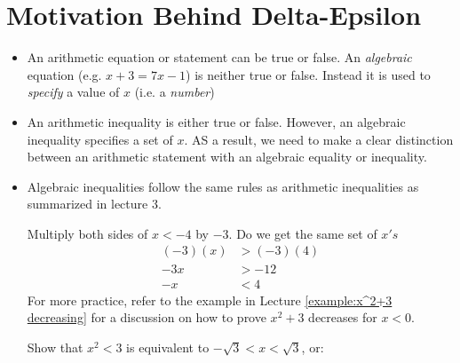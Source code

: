\section{Motivation Behind Delta-Epsilon}
\begin{itemize}
    \item An arithmetic equation or statement can be true or false. An \textit{algebraic} equation (e.g. $x+3=7x-1$) is neither true or false. Instead it is used to \textit{specify} a value of $x$ (i.e. a \textit{number})
    \item An arithmetic inequality is either true or false. However, an algebraic inequality specifies a set of $x$. AS a result, we need to make a clear distinction between an arithmetic statement with an algebraic equality or inequality.
    \item Algebraic inequalities follow the same rules as arithmetic inequalities as summarized in lecture 3.
    \begin{example}
        Multiply both sides of $x<-4$ by $-3$. Do we get the same set of $x's$
        \begin{align}
        (-3)(x) &> (-3)(4) \\ 
        -3x &> -12 \\
        -x &< 4
        \end{align}
        For more practice, refer to the example in Lecture \ref{example:x^2+3 decreasing} for a discussion on how to prove $x^2+3$ decreases for $x<0$.
    \end{example}
    \begin{example}
        Show that $x^2<3$ is equivalent to $-\sqrt{3}<x<\sqrt{3}$, or:
        \begin{center}

\end{center}
\end{example}
\end{itemize}

